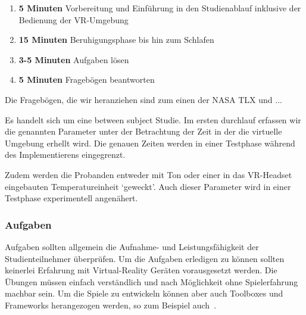 \begin{enumerate}
    \item \textbf{5 Minuten} Vorbereitung und Einführung in den Studienablauf inklusive der Bedienung der VR-Umgebung
    \item \textbf{15 Minuten} Beruhigungsphase bis hin zum Schlafen
    \item \textbf{3-5 Minuten} Aufgaben lösen
    \item \textbf{5 Minuten} Fragebögen beantworten
\end{enumerate}

Die Fragebögen, die wir heranziehen sind zum einen der NASA TLX und ...

Es handelt sich um eine between subject Studie. Im ersten durchlauf erfassen wir die genannten Parameter unter der Betrachtung der Zeit in der die virtuelle Umgebung erhellt wird. Die genauen Zeiten werden in einer Testphase während des Implementierens eingegrenzt.

Zudem werden die Probanden entweder mit Ton oder einer in das VR-Headset eingebauten Temperatureinheit `geweckt'. Auch dieser Parameter wird in einer Testphase experimentell angenähert.

\subsubsection{Aufgaben}
Aufgaben sollten allgemein die Aufnahme- und Leistungsfähigkeit der Studienteilnehmer überprüfen. Um die Aufgaben erledigen zu können sollten keinerlei Erfahrung mit Virtual-Reality Geräten vorausgesetzt werden. Die Übungen müssen einfach verständlich und nach Möglichkeit ohne Spielerfahrung machbar sein. Um die Spiele zu entwickeln können aber auch Toolboxes und Frameworks herangezogen werden, so zum Beispiel auch~\cite{devisch2018mini}.

